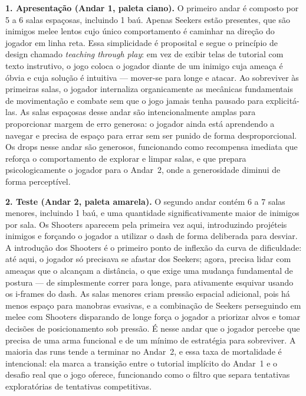 \documentclass[12pt, a4paper]{article}
\begin{document}
\textbf{1. Apresenta\c{c}\~ao (Andar 1, paleta ciano).} O primeiro andar \'e composto por 5 a 6 salas espa\c{c}osas, incluindo 1 ba\'u. Apenas Seekers est\~ao presentes, que s\~ao inimigos melee lentos cujo \'unico comportamento \'e caminhar na dire\c{c}\~ao do jogador em linha reta. Essa simplicidade \'e proposital e segue o princ\'ipio de design chamado \textit{teaching through play}: em vez de exibir telas de tutorial com texto instrutivo, o jogo coloca o jogador diante de um inimigo cuja amea\c{c}a \'e \'obvia e cuja solu\c{c}\~ao \'e intuitiva --- mover-se para longe e atacar. Ao sobreviver \`as primeiras salas, o jogador internaliza organicamente as mec\^anicas fundamentais de movimenta\c{c}\~ao e combate sem que o jogo jamais tenha pausado para explicit\'a-las. As salas espa\c{c}osas desse andar s\~ao intencionalmente amplas para proporcionar margem de erro generosa: o jogador ainda est\'a aprendendo a navegar e precisa de espa\c{c}o para errar sem ser punido de forma desproporcional. Os drops nesse andar s\~ao generosos, funcionando como recompensa imediata que refor\c{c}a o comportamento de explorar e limpar salas, e que prepara psicologicamente o jogador para o Andar~2, onde a generosidade diminui de forma percept\'ivel.

\textbf{2. Teste (Andar 2, paleta amarela).} O segundo andar cont\'em 6 a 7 salas menores, incluindo 1 ba\'u, e uma quantidade significativamente maior de inimigos por sala. Os Shooters aparecem pela primeira vez aqui, introduzindo proj\'eteis inimigos e for\c{c}ando o jogador a utilizar o dash de forma deliberada para desviar. A introdu\c{c}\~ao dos Shooters \'e o primeiro ponto de inflex\~ao da curva de dificuldade: at\'e aqui, o jogador s\'o precisava se afastar dos Seekers; agora, precisa lidar com amea\c{c}as que o alcan\c{c}am a dist\^ancia, o que exige uma mudan\c{c}a fundamental de postura --- de simplesmente correr para longe, para ativamente esquivar usando os i-frames do dash. As salas menores criam press\~ao espacial adicional, pois h\'a menos espa\c{c}o para manobras evasivas, e a combina\c{c}\~ao de Seekers perseguindo em melee com Shooters disparando de longe for\c{c}a o jogador a priorizar alvos e tomar decis\~oes de posicionamento sob press\~ao. \'E nesse andar que o jogador percebe que precisa de uma arma funcional e de um m\'inimo de estrat\'egia para sobreviver. A maioria das runs tende a terminar no Andar~2, e essa taxa de mortalidade \'e intencional: ela marca a transi\c{c}\~ao entre o tutorial impl\'icito do Andar~1 e o desafio real que o jogo oferece, funcionando como o filtro que separa tentativas explorat\'orias de tentativas competitivas.
\end{document}
